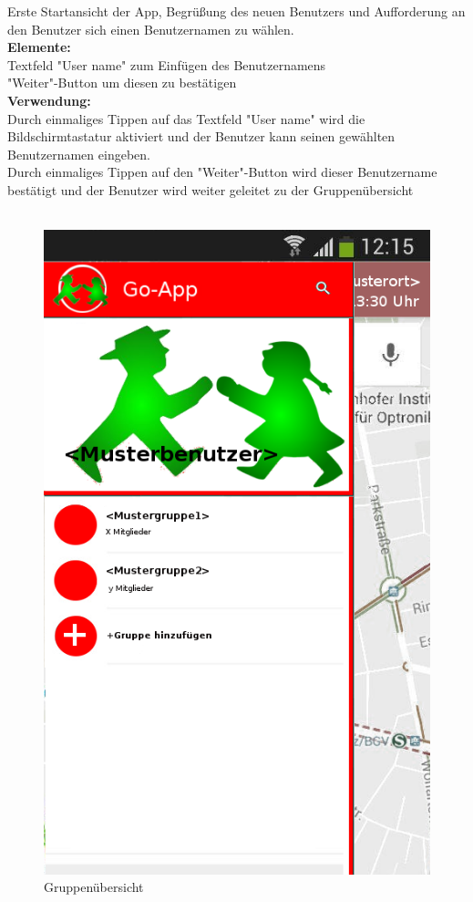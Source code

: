 Erste Startansicht der App, Begrüßung des neuen Benutzers und Aufforderung an den Benutzer sich einen Benutzernamen zu wählen.\\
\textbf{Elemente:}\\
Textfeld "User name" zum Einfügen des Benutzernamens\\
"Weiter"-Button um diesen zu bestätigen\\
\textbf{Verwendung:}\\
Durch einmaliges Tippen auf das Textfeld "User name" wird die Bildschirmtastatur aktiviert und der Benutzer kann seinen gewählten Benutzernamen eingeben.\\
Durch einmaliges Tippen auf den "Weiter"-Button wird dieser Benutzername bestätigt und der Benutzer wird weiter geleitet zu der Gruppenübersicht\\ \\

\begin{figure} [H]
	\caption{Gruppenübersicht}
\begin{center}
	\includegraphics[scale = 0.5]{resources/images/gruppenuebersicht.png}
\end{center}
\end{figure}

